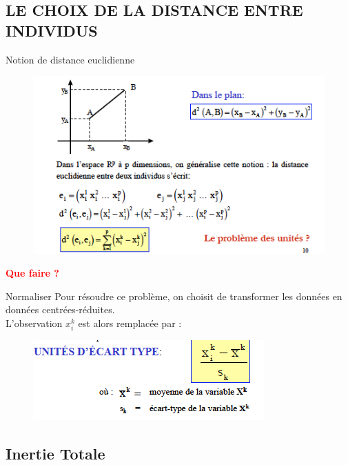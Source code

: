 \documentclass[11pt]{beamer}
\begin{document}
\subsection{LE CHOIX DE LA DISTANCE ENTRE INDIVIDUS}

\begin{frame}{Notion de distance euclidienne}

\begin{figure}
\includegraphics[scale=0.6]{schema8.png} 
\end{figure}

\textcolor{red}{{\Large \textbf{Que faire ?}  }}
\end{frame}


\begin{frame}{Normaliser}
Pour résoudre ce problème, on choisit de transformer les données en données centrées-réduites.\\
L’observation $x_i^k$ est alors remplacée par :

\begin{figure}
\includegraphics[scale=0.6]{schema9.png} 
\end{figure}

\end{frame}

\subsection{Inertie Totale}
\end{document}
